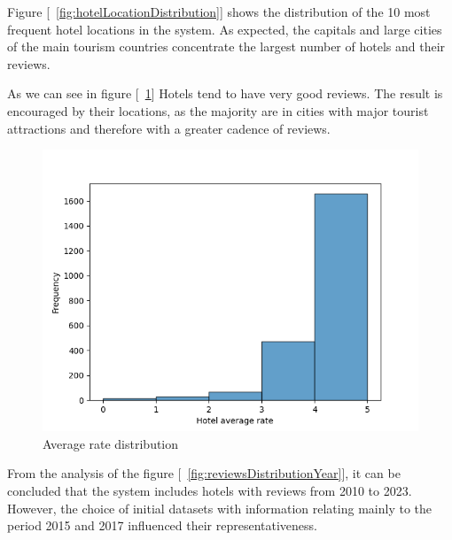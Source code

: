 \documentclass[sigconf]{acmart}
\begin{document}
Figure [~\ref{fig:hotelLocationDistribution}] shows the distribution of the 10 most frequent hotel locations in the system. As expected, the capitals and large cities of the main tourism countries concentrate the largest number of hotels and their reviews.



As we can see in figure [~\ref{fig:averageRateDistribution}] Hotels tend to have very good reviews. The result is encouraged by their locations, as the majority are in cities with major tourist attractions and therefore with a greater cadence of reviews.

\begin{figure}[H]
  \centering
  \includegraphics[width=\linewidth]{imgs/rating_distributions.png}
  \caption{Average rate distribution}
  \label{fig:averageRateDistribution}
\end{figure}

From the analysis of the figure [~\ref{fig:reviewsDistributionYear}], it can be concluded that the system includes hotels with reviews from 2010 to 2023. However, the choice of initial datasets with information relating mainly to the period 2015 and 2017 influenced their representativeness.
\end{document}
